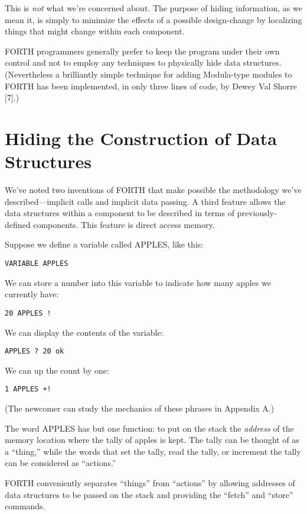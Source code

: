 This is \emph{not} what we're concerned about. The purpose of hiding
information, as we mean it, is simply to minimize the effects of a
possible design-change by localizing things that might change within
each component.

FORTH programmers generally prefer to keep the program under their
own control and not to employ any techniques to physically hide data
structures. (Nevertheless a brilliantly simple technique for adding
Modula-type modules to FORTH has been implemented, in only three lines
of code, by Dewey Val Shorre {[}7{]}.)


\section{Hiding the Construction of Data Structures}

We've noted two inventions of FORTH that make possible the methodology
we've described---implicit calls and implicit data passing. A third
feature allows the data structures within a component to be described
in terms of previously-defined components. This feature is direct
access memory.

Suppose we define a variable called APPLES, like this:

\begin{verbatim}
VARIABLE APPLES
\end{verbatim}
We can store a number into this variable to indicate how many apples
we currently have:

\begin{verbatim}
20 APPLES !
\end{verbatim}
We can display the contents of the variable:

\begin{verbatim}
APPLES ? 20 ok
\end{verbatim}
We can up the count by one:

\begin{verbatim}
1 APPLES +!
\end{verbatim}
(The newcomer can study the mechanics of these phrases in Appendix
A.)

The word APPLES has but one function: to put on the stack the \emph{address}
of the memory location where the tally of apples is kept. The tally
can be thought of as a {}``thing,'' while the words that set the
tally, read the tally, or increment the tally can be considered as
{}``actions.''

FORTH conveniently separates {}``things'' from {}``actions'' by
allowing addresses of data structures to be passed on the stack and
providing the {}``fetch'' and {}``store'' commands.

